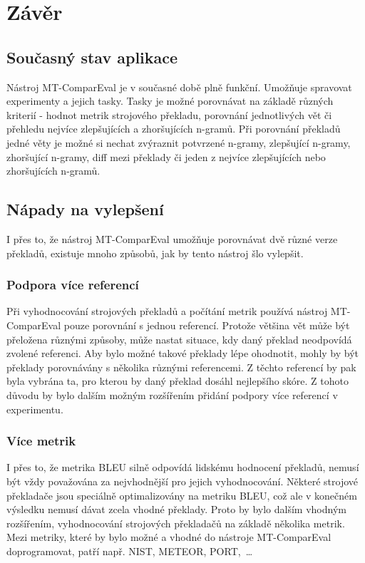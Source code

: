\chapter{Závěr}

\section{Současný stav aplikace}
Nástroj MT-ComparEval je v současné době plně funkční.
Umožňuje spravovat experimenty a jejich tasky.
Tasky je možné porovnávat na základě různých kriterií -
  hodnot metrik strojového překladu,
  porovnání jednotlivých vět
  či přehledu nejvíce zlepšujících a zhoršujících \mbox{n-gramů}.
Při porovnání překladů jedné věty je možné si nechat zvýraznit
  potvrzené \mbox{n-gramy}, zlepšující \mbox{n-gramy}, zhoršující \mbox{n-gramy}, diff mezi překlady
  či jeden z nejvíce zlepšujících nebo zhoršujících \mbox{n-gramů}.


\section{Nápady na vylepšení}
I přes to, že nástroj MT-ComparEval umožňuje porovnávat dvě různé verze překladů,
  existuje mnoho způsobů,
  jak by tento nástroj šlo vylepšit.

\subsection{Podpora více referencí}
Při vyhodnocování strojových překladů a počítání metrik používá nástroj MT-ComparEval pouze porovnání s jednou referencí.
Protože většina vět může být přeložena různými způsoby,
  může nastat situace,
  kdy daný překlad neodpovídá zvolené referenci.
Aby bylo možné takové překlady lépe ohodnotit,
  mohly by být překlady porovnávány s několika různými referencemi.
Z těchto referencí by pak byla vybrána ta,
  pro kterou by daný překlad dosáhl nejlepšího skóre.
Z tohoto důvodu by bylo dalším možným rozšířením přidání podpory více referencí v experimentu.

\subsection{Více metrik}
I přes to, že metrika BLEU silně odpovídá lidskému hodnocení překladů,
  nemusí být vždy považována za nejvhodnější pro jejich vyhodnocování.
Některé strojové překladače jsou speciálně optimalizovány na metriku BLEU,
  což ale v konečném výsledku nemusí dávat zcela vhodné překlady.
Proto by bylo dalším vhodným rozšířením,
  vyhodnocování strojových překladačů na základě několika metrik.
Mezi metriky,
  které by bylo možné a vhodné do nástroje MT-ComparEval doprogramovat,
  patří např. NIST, METEOR, PORT,~\dots

